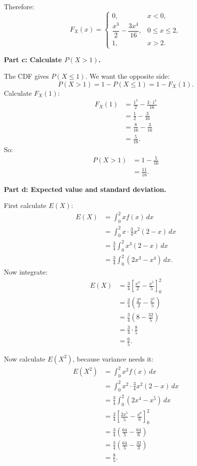 \documentclass[11pt,a4paper]{article}
\begin{document}
Therefore:
\[
F_X(x)=
\begin{cases}
0, & x<0,\\[1mm]
\dfrac{x^3}{2}-\dfrac{3x^4}{16}, & 0\le x\le 2,\\[2mm]
1, & x>2.
\end{cases}
\]

\textbf{Part c: Calculate \(P(X>1)\).}

The CDF gives \(P(X\le 1)\). We want the opposite side:
\[
P(X>1)=1-P(X\le 1)=1-F_X(1).
\]
Calculate \(F_X(1)\):
\begin{align*}
F_X(1)
&=\frac{1^3}{2}-\frac{3\cdot 1^4}{16}\\
&=\frac{1}{2}-\frac{3}{16}\\
&=\frac{8}{16}-\frac{3}{16}\\
&=\frac{5}{16}.
\end{align*}
So:
\begin{align*}
P(X>1)
&=1-\frac{5}{16}\\
&=\frac{11}{16}.
\end{align*}

\textbf{Part d: Expected value and standard deviation.}

First calculate \(E(X)\):
\begin{align*}
E(X)
&=\int_0^2 x f(x)\,dx\\
&=\int_0^2 x\cdot \frac{3}{4}x^2(2-x)\,dx\\
&=\frac{3}{4}\int_0^2 x^3(2-x)\,dx\\
&=\frac{3}{4}\int_0^2(2x^3-x^4)\,dx.
\end{align*}
Now integrate:
\begin{align*}
E(X)
&=\frac{3}{4}\left[\frac{x^4}{2}-\frac{x^5}{5}\right]_0^2\\
&=\frac{3}{4}\left(\frac{2^4}{2}-\frac{2^5}{5}\right)\\
&=\frac{3}{4}\left(8-\frac{32}{5}\right)\\
&=\frac{3}{4}\cdot \frac{8}{5}\\
&=\frac{6}{5}.
\end{align*}

Now calculate \(E(X^2)\), because variance needs it:
\begin{align*}
E(X^2)
&=\int_0^2 x^2 f(x)\,dx\\
&=\int_0^2 x^2\cdot \frac{3}{4}x^2(2-x)\,dx\\
&=\frac{3}{4}\int_0^2(2x^4-x^5)\,dx\\
&=\frac{3}{4}\left[\frac{2x^5}{5}-\frac{x^6}{6}\right]_0^2\\
&=\frac{3}{4}\left(\frac{64}{5}-\frac{64}{6}\right)\\
&=\frac{3}{4}\left(\frac{64}{5}-\frac{32}{3}\right)\\
&=\frac{8}{5}.
\end{align*}
\end{document}
